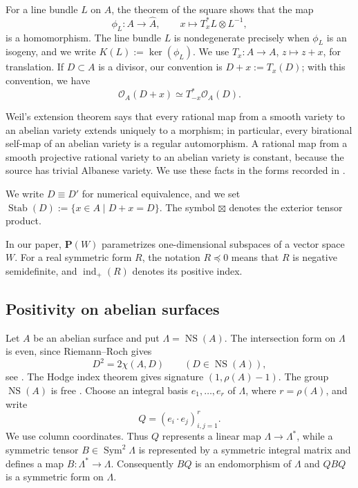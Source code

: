 \documentclass[12pt]{amsart}
\numberwithin{equation}{section}
\theoremstyle{definition}
\theoremstyle{remark}
\newcommand{\PP}{\mathbf P}
\newcommand{\cO}{\mathcal O}
\newcommand{\NS}{\operatorname{NS}}
\newcommand{\Sym}{\operatorname{Sym}}
\newcommand{\indp}{\operatorname{ind}_{+}}
\begin{document}
For a line bundle $L$ on $A$, the theorem of the square shows that the
map
\[
  \phi_L:A\longrightarrow\widehat A,
  \qquad x\longmapsto T_x^*L\otimes L^{-1},
\]
is a homomorphism.  The line bundle $L$ is nondegenerate precisely when
$\phi_L$ is an isogeny, and we write $K(L):=\ker(\phi_L)$.  We use
$T_x:A\to A$, $z\mapsto z+x$, for translation.  If $D\subset A$ is a
divisor, our convention is $D+x:=T_x(D)$; with this convention, we have
\begin{equation}
  \cO_A(D+x)\simeq T_{-x}^*\cO_A(D).
\label{eq:translate-convention}
\end{equation}
\nopagebreak[4]

Weil's extension theorem
says that every rational map from a smooth variety to an abelian variety
extends uniquely to a morphism; in particular, every birational self-map
of an abelian variety is a regular automorphism.  A rational map from a
smooth projective rational variety to an abelian variety is constant,
because the source has trivial Albanese variety.  We use these facts in
the forms recorded in \cite[Theorem~4.9.4 and Proposition~4.9.5]{BL}.

We write $D\equiv D'$ for numerical equivalence, and we set
$\operatorname{Stab}(D):=\{x\in A\mid D+x=D\}$.  The symbol $\boxtimes$
denotes the exterior tensor product.


In our paper, $\PP(W)$
parametrizes one-dimensional subspaces of a vector space $W$. For a real symmetric form $R$, the notation $R\preceq0$ means that $R$
is negative semidefinite, and $\indp(R)$ denotes its positive index.


\subsection{Positivity on abelian surfaces}
Let $A$ be an abelian surface and put $\Lambda=\NS(A)$.  The
intersection form on $\Lambda$ is even, since Riemann--Roch gives
\begin{equation}\label{eq:even-intersection}
                         D^2=2\chi(A,D)
                         \qquad(D\in\NS(A)),
\end{equation}
see \cite[Theorem~3.6.3]{BL}.  The Hodge index theorem gives signature
$(1,\rho(A)-1)$.  The group $\NS(A)$ is free
\cite[Corollary~5.3.9]{BL}.
Choose an integral basis $e_1,\dots,e_r$ of $\Lambda$, where
$r=\rho(A)$, and write
\[
                         Q=(e_i\cdot e_j)_{i,j=1}^r.
\]
We use column coordinates.  Thus $Q$ represents a linear map
$\Lambda\to\Lambda^*$, while a symmetric tensor
$B\in \Sym^2\Lambda$ is represented by a
symmetric integral matrix and defines a map
$B:\Lambda^*\to\Lambda$.  Consequently $BQ$ is an
endomorphism of $\Lambda$ and $QBQ$ is a symmetric form on $\Lambda$.
\end{document}
